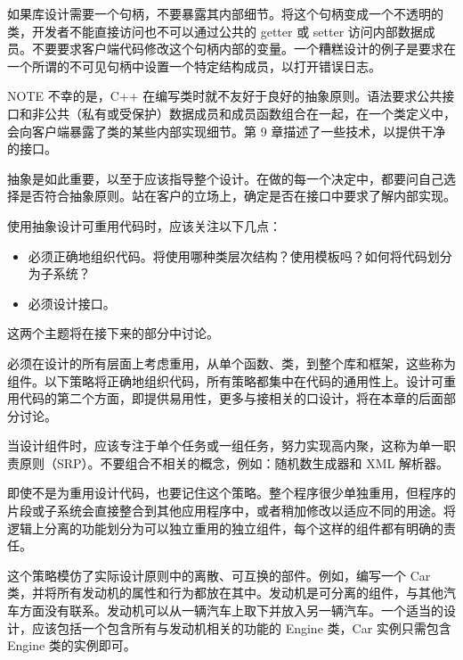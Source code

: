 如果库设计需要一个句柄，不要暴露其内部细节。将这个句柄变成一个不透明的类，开发者不能直接访问也不可以通过公共的 getter 或 setter 访问内部数据成员。不要要求客户端代码修改这个句柄内部的变量。一个糟糕设计的例子是要求在一个所谓的不可见句柄中设置一个特定结构成员，以打开错误日志。

\begin{myNotic}{NOTE}
不幸的是，C++ 在编写类时就不友好于良好的抽象原则。语法要求公共接口和非公共（私有或受保护）数据成员和成员函数组合在一起，在一个类定义中，会向客户端暴露了类的某些内部实现细节。第 9 章描述了一些技术，以提供干净的接口。
\end{myNotic}

抽象是如此重要，以至于应该指导整个设计。在做的每一个决定中，都要问自己选择是否符合抽象原则。站在客户的立场上，确定是否在接口中要求了解内部实现。

使用抽象设计可重用代码时，应该关注以下几点：

\begin{itemize}
\item
必须正确地组织代码。将使用哪种类层次结构？使用模板吗？如何将代码划分为子系统？

\item
必须设计接口。
\end{itemize}

这两个主题将在接下来的部分中讨论。


必须在设计的所有层面上考虑重用，从单个函数、类，到整个库和框架，这些称为组件。以下策略将正确地组织代码，所有策略都集中在代码的通用性上。设计可重用代码的第二个方面，即提供易用性，更多与接相关的口设计，将在本章的后面部分讨论。


当设计组件时，应该专注于单个任务或一组任务，努力实现高内聚，这称为单一职责原则（SRP）。不要组合不相关的概念，例如：随机数生成器和 XML 解析器。

即使不是为重用设计代码，也要记住这个策略。整个程序很少单独重用，但程序的片段或子系统会直接整合到其他应用程序中，或者稍加修改以适应不同的用途。将逻辑上分离的功能划分为可以独立重用的独立组件，每个这样的组件都有明确的责任。

这个策略模仿了实际设计原则中的离散、可互换的部件。例如，编写一个 Car 类，并将所有发动机的属性和行为都放在其中。发动机是可分离的组件，与其他汽车方面没有联系。发动机可以从一辆汽车上取下并放入另一辆汽车。一个适当的设计，应该包括一个包含所有与发动机相关的功能的 Engine 类，Car 实例只需包含 Engine 类的实例即可。


